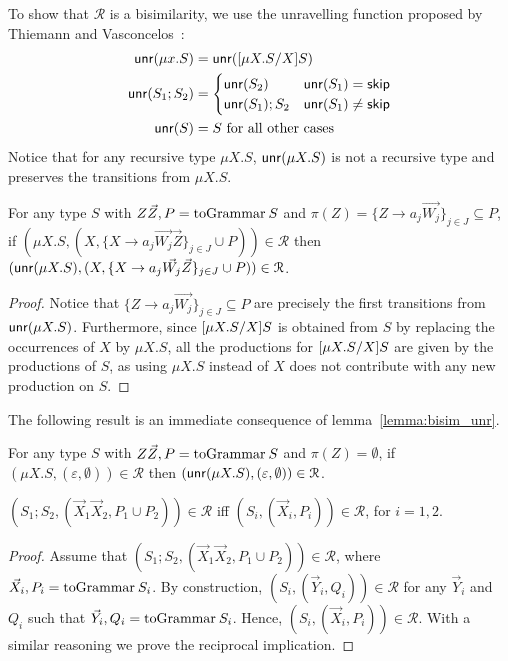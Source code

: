 To show that $\mathcal{R}$ is a bisimilarity, we use
the unravelling function proposed 
by Thiemann and Vasconcelos~\cite{thiemann2016context}:
\[\begin{aligned}
\mathsf{unr}(\mu x . S) &= \mathsf{unr}([{\mu X.S}/{X}] S)\\
\mathsf{unr}(S_1;S_2) &= 
\begin{cases}
	\mathsf{unr}(S_2) & \mathsf{unr}(S_1)=\mathsf{skip}\\
	\mathsf{unr}(S_1);S_2 & \mathsf{unr}(S_1)\neq\mathsf{skip}\\
\end{cases} \\
\mathsf{unr}(S)&= S \text{  for all other cases}
\end{aligned}\]
%
Notice that for any recursive type 
$\mu X.S$, $\mathsf{unr}(\mu X.S)$ is not a recursive type and preserves the 
transitions from $\mu X.S$.

\begin{lemma}
  \label{lemma:bisim_unr}
  For any type $S$ with $Z\vec Z, P = \toGrammarf{S}$
  and $\pi(Z) = \{Z \rightarrow a_j \vec {W_j}\}_{j\in J}\subseteq P$, if
  $(\mu X.S, (X, \{X \rightarrow a_j \vec {W_j}\vec Z\}_{j\in J} \cup
  P))\in \mathcal{R}$ then
  $(\mathsf{unr}(\mu X.S), (X, \{X \rightarrow a_j \vec {W_j}\vec
  Z\}_{j\in J} \cup P)) \in \mathcal{R}$.
\end{lemma}

\begin{proof}
	Notice that $\{Z \rightarrow a_j \vec {W_j}\}_{j\in J}\subseteq P$ are 
	precisely the first 
	transitions from $\mathsf{unr}(\mu X.S)$. Furthermore, since 
	$[{\mu X.S}/{X}] S$ is obtained from $S$ by 
	replacing the occurrences of $X$ by $\mu X.S$, all the productions for
	$[{\mu X.S}/{X}] S$ 
	are given by the productions of $S$, as using $\mu X.S$
	instead of $X$ does not contribute with any new production on $S$.
\end{proof}

The following result is an immediate consequence of lemma~\ref{lemma:bisim_unr}.
\begin{corollary}
\label{corol:bisim_unr}
	For any type $S$ with $Z\vec Z, P = \toGrammarf{S}$ and $\pi(Z) =\emptyset$,
	if  $(\mu X.S, (\varepsilon, \emptyset))\in \mathcal{R}$ then
  $(\mathsf{unr}(\mu X.S), (\varepsilon, \emptyset)) \in \mathcal{R}$.
\end{corollary}


\begin{lemma}
\label{lemma:bisim_semi}
	$(S_1;S_2, (\vec X_1\vec X_2,  P_1 \cup  P_2))\in\mathcal{R}$ iff 
	$(S_i, (\vec X_i,  P_i))\in\mathcal{R}$, for $i=1,2$.
\end{lemma}
\begin{proof}
	Assume that $(S_1;S_2, (\vec X_1\vec X_2,  P_1 \cup  P_2))\in\mathcal{R}$,
	where $ \vec X_i, P_i = \toGrammarf{S_i}$.
	By construction, $(S_i, (\vec Y_i,  Q_i))\in\mathcal{R}$ for any
	$\vec Y_i$ and $Q_i$ such that $ \vec Y_i, Q_i = \toGrammarf{S_i}$.
	Hence, $(S_i, (\vec X_i,  P_i))\in\mathcal{R}$. With a similar reasoning 
	we prove the reciprocal implication.
\end{proof}

